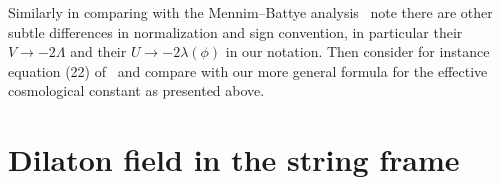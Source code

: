 \documentclass[a4paper,10pt]{article}
\begin{document}
{Similarly in comparing with the Mennim--Battye analysis~\cite{Wands}
note there are other subtle differences in normalization and sign
convention, in particular their $V \to -2\Lambda$ and their $U \to
-2\lambda(\phi)$ in our notation. Then consider for instance equation
(22) of~\cite{Mennim} and compare with our more general formula for the
effective cosmological constant as presented above.

\section{Dilaton field in the string frame}
\setcounter{equation}{0}


}
\end{document}
